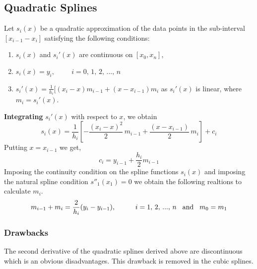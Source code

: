 \documentclass[aima203_lecturenotes_ku.tex]{subfiles}
\begin{document}
\subsection{Quadratic Splines}
Let $s_i(x)$ be a quadratic approximation of the data points in the sub-interval $[x_{i-1} -x_i]$ satisfying the following conditions:
\begin{enumerate}
\item $s_i(x)$ and $s_i'(x)$ are continuous on $[x_0,x_n]$,
\item $s_i(x)=y_i, \hspace{1cm} i=0,\, 1,\, 2, \, ..., \, n$
\item $s_i'(x) = \frac{1}{h_i} [ (x_i -x)m_{i-1} + (x-x_{i-1})m_i$ as $s_i'(x)$ is linear, where $m_i = s_i'(x)$.
\end{enumerate}
\textbf{Integrating} $s_i'(x)$ with respect to $x$, we obtain
\begin{equation}
  s_i(x) = \frac{1}{h_i} \left [ -\frac{(x_i -x)^2}{2}\, m_{i-1} + \frac{(x-x_{i-1})}{2} \, m_i \right ] + c_i
\end{equation}
Putting $x=x_{i-1}$ we get,
\begin{equation}
  c_i = y_{i-1} + \frac{h_i}{2}m_{i-1}
\end{equation}
Imposing the continuity condition on the spline functions $s_i(x)$ and imposing the natural spline condition $s''_1(x_1)=0$ we obtain the following realtions to calculate $m_i$.
\begin{equation}
  m_{i-1} +m_{i} = \frac{2}{h_i}(y_i -y_{i-1}), \hspace{1cm} i = 1,\, 2, \, ..., \, n \hspace{3mm} \text{and} \hspace{3mm} m_0 = m_1
\end{equation}

\subsubsection{Drawbacks}
The second derivative of the quadratic splines derived above are discontinuous which is an obvious disadvantages. This drawback is removed in the cubic splines.
\end{document}
